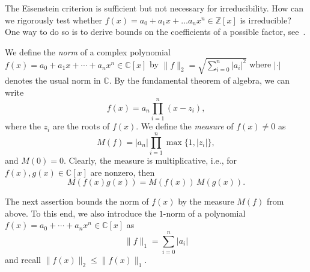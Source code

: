 The Eisenstein criterion is sufficient but not necessary for irreducibility. How can we rigorously test whether $f(x) = a_0 + a_1 x + \dots a_n x^n ∈ ℤ[x]$  is irreducible? One way to do so is to derive bounds on the coefficients of a possible factor, see~\cite{mignotte1974inequality}.

We define the \emph{norm} of a complex polynomial  $f(x) = a_0+a_1x+ \cdots+a_nx^n ∈ ℂ[x]$ by  $\|f\|_2 = \sqrt{∑_{i=0}^n |a_i|^2}$ where $|⋅|$ denotes the usual norm in $ℂ$. By the fundamental theorem of algebra, we can write
\begin{displaymath}
f(x)  = a_n ∏_{i=1}^n (x-z_i),  
\end{displaymath}
where the $z_i$ are the roots of $f(x)$. We define the \emph{measure} of $f(x)≠0$ as
\begin{displaymath}
  M(f) = |a_n| ∏_{i=1}^n \max\{1,|z_i|\},
\end{displaymath}
and $M(0) = 0$. 
Clearly, the measure is multiplicative, i.e., for $f(x),g(x) ∈ℂ[x]$ are nonzero, then
\begin{displaymath}
  M(f(x)g(x)) = M(f(x)) \, M (g(x)). 
\end{displaymath}


The next assertion bounds the norm of $f(x)$ by the measure $M(f)$ from above. To this end, we also introduce the $1$-norm of a polynomial $f(x) = a_0+ \cdots+a_nx^n∈ ℂ[x]$ as
\begin{displaymath}
  \|f\|_1 = ∑_{i=0}^n |a_i| 
\end{displaymath}
and recall $\|f(x)\|_2 ≤ \|f(x)\|_1$. 

